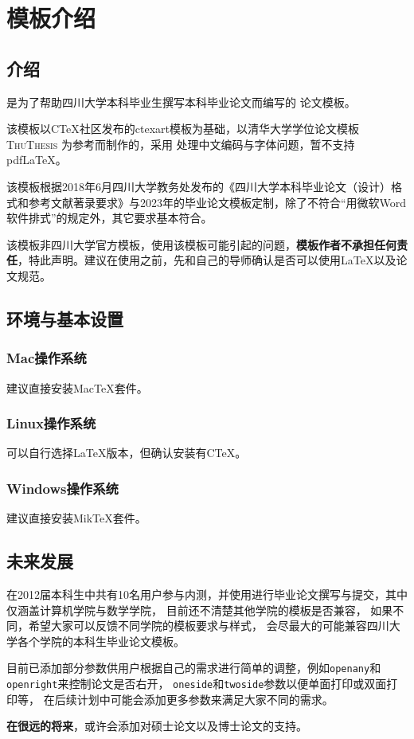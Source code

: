 \chapter{模板介绍}
\section{介绍}

	\scuthesis{}是为了帮助四川大学本科毕业生撰写本科毕业论文而编写的 \LaTeXe{}\cite{knuth_texbook_1986} 论文模板。

	该模板以C\TeX{}社区发布的ctexart模板为基础，以清华大学学位论文模板
	\textsc{ThuThesis}
	为参考而制作的，采用
	\XeLaTeX{}
	处理中文编码与字体问题，暂不支持 pdf\LaTeX{}。

	该模板根据2018年6月四川大学教务处发布的《四川大学本科毕业论文（设计）格式和参考文献著录要求》与2023年的毕业论文模板定制，除了不符合“用微软Word软件排式”的规定外，其它要求基本符合。

	该模板非四川大学官方模板，使用该模板可能引起的问题，\textbf{模板作者不承担任何责任}，特此声明。建议在使用之前，先和自己的导师确认是否可以使用\LaTeX{}以及论文规范。

\section{环境与基本设置}
\subsection{Mac操作系统}
建议直接安装Mac\TeX{}套件。
\subsection{Linux操作系统}
可以自行选择\LaTeX{}版本，但确认安装有C\TeX{}。
\subsection{Windows操作系统}
建议直接安装Mik\TeX{}套件。

\section{未来发展}
在2012届本科生中共有10名用户参与内测，并使用\scuthesis{}进行毕业论文撰写与提交，其中仅涵盖计算机学院与数学学院，
目前还不清楚其他学院的模板是否兼容，
如果不同，希望大家可以反馈不同学院的模板要求与样式，
\scuthesis{}会尽最大的可能兼容四川大学各个学院的本科生毕业论文模板。

\scuthesis{}目前已添加部分参数供用户根据自己的需求进行简单的调整，例如\texttt{openany}和\texttt{openright}来控制论文是否右开，
\texttt{oneside}和\texttt{twoside}参数以便单面打印或双面打印等，
在后续计划中可能会添加更多参数来满足大家不同的需求。

\textbf{在很远的将来}，\scuthesis{}或许会添加对硕士论文以及博士论文的支持。
